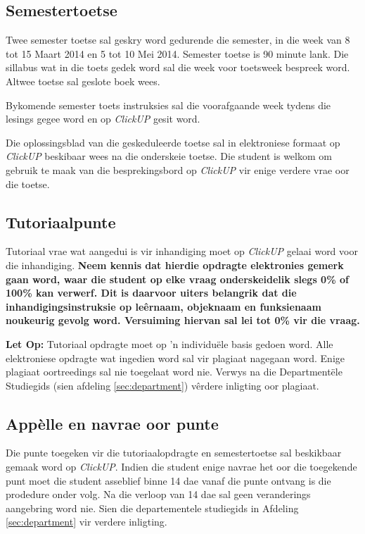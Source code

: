     \subsection{Semestertoetse}
    Twee semester toetse sal geskry word gedurende die semester, in
    die week van 8 tot 15 Maart 2014 en 5 tot 10 Mei 2014. Semester
    toetse is 90 minute lank.  Die sillabus wat in die toets gedek
    word sal die week voor toetsweek bespreek word.  Altwee toetse sal
    geslote boek wees.

    Bykomende semester toets instruksies sal die voorafgaande week
    tydens die lesings gegee word en op \textit{ClickUP} gesit word.

    Die oplossingsblad van die geskeduleerde toetse sal in
    elektroniese formaat op \textit{ClickUP} beskibaar wees na die onderskeie
    toetse. Die student is welkom om gebruik te maak van die
    besprekingsbord op \textit{ClickUP} vir enige verdere vrae oor die
    toetse.

    \subsection{Tutoriaalpunte}
    \label{sec:tutoriaal}

    Tutoriaal vrae wat aangedui is vir inhandiging moet op
    \textit{ClickUP} gelaai word voor die inhandiging. \textbf{Neem
      kennis dat hierdie opdragte elektronies gemerk gaan word, waar
      die student op elke vraag onderskeidelik slegs 0\% of 100\% kan
      verwerf. Dit is daarvoor uiters belangrik dat die
      inhandigingsinstruksie op le\^ernaam, objeknaam en funksienaam
      noukeurig gevolg word.  Versuiming hiervan sal lei tot 0\% vir
      die vraag.}

    \textbf{Let Op:} Tutoriaal opdragte moet op 'n individu\"ele basis gedoen
    word. Alle elektroniese opdragte wat ingedien word sal vir plagiaat
    nagegaan word. Enige plagiaat oortreedings sal nie toegelaat word nie.
    Verwys na die Department\"ele Studiegids (sien afdeling
    \ref{sec:department}) v\^erdere inligting oor plagiaat.


    \subsection{App\`{e}lle en navrae oor punte}
    Die punte toegeken vir die tutoriaalopdragte en semestertoetse sal
    beskikbaar gemaak word op \textit{ClickUP}. Indien die student
    enige navrae het oor die toegekende punt moet die student
    asseblief binne 14 dae vanaf die punte ontvang is die prodedure
    onder volg.  Na die verloop van 14 dae sal geen veranderings
    aangebring word nie. Sien die departementele studiegids in
    Afdeling \ref{sec:department} vir verdere inligting.

